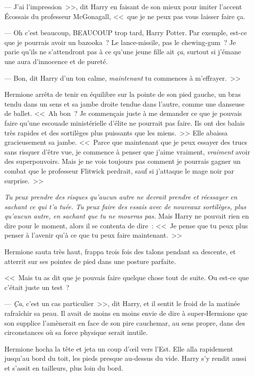 --- J'ai l'impression~>>, dit Harry en faisant de son mieux pour imiter l'accent Écossais du professeur McGonagall, <<~que je ne peux pas vous laisser faire ça.

--- Oh c'est beaucoup, BEAUCOUP trop tard, Harry Potter. Par exemple, est-ce que je pourrais avoir un bazooka~? Le lance-missile, pas le chewing-gum~? Je parie qu'ils ne s'attendront pas à ce qu'une jeune fille ait \emph{ça}, surtout si j'émane une aura d'innocence et de pureté.

--- Bon, dit Harry d'un ton calme, \emph{maintenant} tu commences à m'effrayer.~>>

Hermione arrêta de tenir en équilibre sur la pointe de son pied gauche, un bras tendu dans un sens et sa jambe droite tendue dans l'autre, comme une danseuse de ballet. <<~Ah bon~? Je commençais juste à me demander ce que je pouvais faire qu'une escouade ministérielle d'élite ne pourrait pas faire. Ils ont des balais très rapides et des sortilèges plus puissants que les miens.~>> Elle abaissa gracieusement sa jambe. <<~Parce que maintenant que je peux essayer des trucs sans risquer d'être vue, je commence à penser que j'aime vraiment, \emph{vraiment} avoir des superpouvoirs. Mais je ne vois toujours pas comment je pourrais gagner un combat que le professeur Flitwick perdrait, sauf si j'attaque le mage noir par surprise.~>>

\emph{Tu peux prendre des risques qu'aucun autre ne devrait prendre et réessayer en sachant ce qui t'a tuée. Tu peux faire des essais avec de nouveaux sortilèges, plus qu'aucun autre, en sachant que tu ne mourras pas.} Mais Harry ne pouvait rien en dire pour le moment, alors il se contenta de dire~: <<~Je pense que tu peux plus penser à l'avenir qu'à ce que tu peux faire maintenant.~>>

Hermione sauta très haut, frappa trois fois des talons pendant sa descente, et atterrit sur ses pointes de pied dans une posture parfaite.

<<~Mais tu as dit que je pouvais faire quelque chose tout de suite. Ou est-ce que c'était juste un test~?

--- \emph{Ça}, c'est un cas particulier~>>, dit Harry, et il sentit le froid de la matinée rafraîchir sa peau. Il avait de moins en moins envie de dire à super-Hermione que son supplice l'amènerait en face de son pire cauchemar, au sens propre, dans des circonstances où sa force physique serait inutile.

Hermione hocha la tête et jeta un coup d'œil vers l'Est. Elle alla rapidement jusqu'au bord du toit, les pieds presque au-dessus du vide. Harry s'y rendit aussi et s'assit en tailleurs, plus loin du bord.

